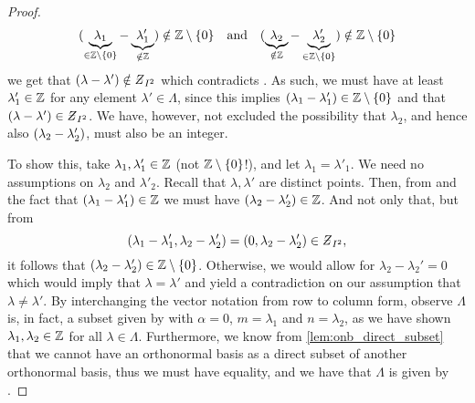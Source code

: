 \documentclass[../thesis.tex]{subfiles}
\begin{document}
\begin{proof}
\begin{align*}
        (\underbrace{\lambda_1}_{\in \mathbb{Z}\setminus\{0\}}-\underbrace{\lambda_1'}_{\notin \mathbb{Z}}) \notin \mathbb{Z}\setminus\{0\}
        \quad \text{and} \quad
        (\underbrace{\lambda_2}_{\notin \mathbb{Z}}-\underbrace{\lambda_2'}_{\in \mathbb{Z}\setminus\{0\}}) \notin \mathbb{Z}\setminus\{0\}
    \end{align*}
    we get that $\brac{\lambda-\lambda'} \notin \Zstroke_{I^2}$ which contradicts . As such, we must have at least $\lambda_1'\in \mathbb{Z}$ for any element $\lambda'\in \Lambda$, since this implies $(\lambda_1 - \lambda_1')\in \mathbb{Z}\setminus\{0\}$ and that $\brac{\lambda-\lambda'} \in \Zstroke_{I^2}$. We have, however, not excluded the possibility that $\lambda_2$, and hence also $(\lambda_2 - \lambda_2')$, must also be an integer.
    
    
    To show this, take $\lambda_1,\lambda'_1 \in \mathbb{Z}$ (not $\mathbb{Z}\setminus\{0\}$!), and let $\lambda_1 = \lambda'_1$. We need no assumptions on $\lambda_2$ and $\lambda'_2$. Recall that $\lambda,\lambda'$ are distinct points. Then, from  and the fact that $(\lambda_1-\lambda'_1)\in \mathbb{Z}$ we must have $(\lambda_2-\lambda_2') \in \mathbb{Z}$. And not only that, but from
    \begin{equation*}
        \brac{\lambda_1-\lambda'_1,\lambda_2-\lambda'_2} = \brac{0,\lambda_2-\lambda'_2}\in \Zstroke_{I^2},
    \end{equation*}
    it follows that $(\lambda_2- \lambda_2') \in \mathbb{Z}\setminus\{0\}$. Otherwise, we would allow for $\lambda_2-\lambda_2'=0$ which would imply that $\lambda=\lambda'$ and yield a contradiction on our assumption that $\lambda\neq\lambda'$. By interchanging the vector notation from row to column form, observe $\Lambda$ is, in fact, a subset given by  with $\alpha = 0$, $m = \lambda_1$ and $n = \lambda_2$, as we have shown $\lambda_1, \lambda_2 \in \mathbb{Z}$ for all $\lambda \in \Lambda$. Furthermore, we know from \cref{lem:onb_direct_subset} that we cannot have an orthonormal basis as a direct subset of another orthonormal basis, thus we must have equality, and we have that $\Lambda$ is given by .


\end{proof}
\end{document}
